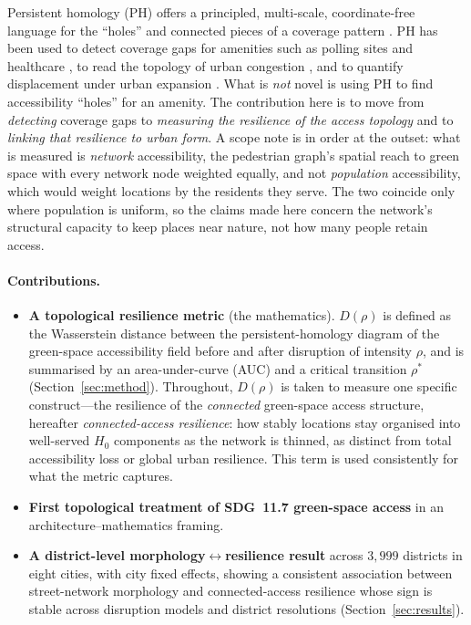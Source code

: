 \documentclass[sn-mathphys-num,pdflatex]{sn-jnl}
\newcommand{\Drho}{D(\rho)}
\newcommand{\rhostar}{\rho^{*}}
\begin{document}
Persistent homology (PH) offers a principled, multi-scale, coordinate-free
language for the ``holes'' and connected pieces of a coverage pattern
\citep{otter2017roadmap,feng2021tda}. PH has been used to detect coverage gaps
for amenities such as polling sites \citep{hickok2022polling} and healthcare
\citep{gonzalez2025healthcare}, to read the topology of urban congestion
\citep{wu2017congestion}, and to quantify displacement under urban expansion
\citep{rodriguez2025displacement}. What is \emph{not} novel is using PH to find
accessibility ``holes'' for an amenity. The contribution here is to move from
\emph{detecting} coverage gaps to \emph{measuring the resilience of the access
topology} and to \emph{linking that resilience to urban form}. A scope note is in
order at the outset: what is measured is \emph{network} accessibility, the pedestrian
graph's spatial reach to green space with every network node weighted equally, and
not \emph{population} accessibility, which would weight locations by the residents
they serve. The two coincide only where population is uniform, so the claims made
here concern the network's structural capacity to keep places near nature, not how
many people retain access.

\paragraph{Contributions.}
\begin{itemize}
  \item \textbf{A topological resilience metric} (the mathematics). $\Drho$ is
    defined as the Wasserstein distance between the persistent-homology diagram of
    the green-space accessibility field before and after disruption of intensity
    $\rho$, and is summarised by an area-under-curve (AUC) and a critical
    transition $\rhostar$ (Section~\ref{sec:method}). Throughout, $\Drho$ is taken to
    measure one specific construct---the resilience of the \emph{connected} green-space
    access structure, hereafter \emph{connected-access resilience}: how stably locations
    stay organised into well-served $H_0$ components as the network is thinned, as
    distinct from total accessibility loss or global urban resilience. This term is used
    consistently for what the metric captures.
  \item \textbf{First topological treatment of SDG~11.7 green-space access} in an
    architecture--mathematics framing.
  \item \textbf{A district-level morphology$\leftrightarrow$resilience result}
    across $3{,}999$ districts in eight cities, with city fixed effects, showing a
    consistent association between street-network morphology and connected-access
    resilience whose sign is stable across disruption models and district resolutions
    (Section~\ref{sec:results}).
\end{itemize}
\end{document}
